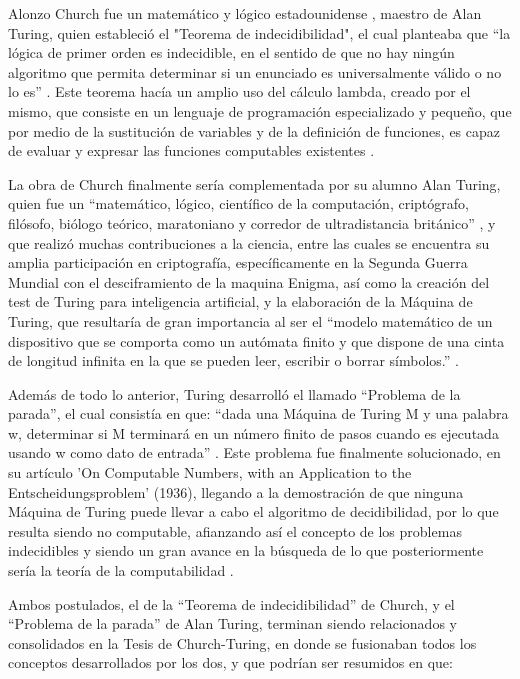 \documentclass[11pt]{article}
\begin{document}
{Alonzo Church fue un matemático y lógico estadounidense \citep{ChurchWiki}, maestro de Alan Turing, quien estableció el "Teorema de indecidibilidad", el cual planteaba que “la lógica de primer orden es indecidible, en el sentido de que no hay ningún algoritmo que permita determinar si un enunciado es universalmente válido o no lo es” \citep{RojasBarba}. Este teorema hacía un amplio uso del cálculo lambda, creado por el mismo, que consiste en un lenguaje de programación especializado y pequeño, que por medio de la sustitución de variables y de la definición de funciones, es capaz de evaluar y expresar las funciones computables existentes \citep{LambdaEcu}.
\newline

La obra de Church finalmente sería complementada por su alumno Alan Turing, quien fue un “matemático, lógico, científico de la computación, criptógrafo, filósofo, biólogo teórico, maratoniano y corredor de ultradistancia británico” \citep{TuringWiki}, y que realizó muchas contribuciones a la ciencia, entre las cuales se encuentra su amplia participación en criptografía, específicamente en la Segunda Guerra Mundial con el desciframiento de la maquina Enigma, así como la creación del test de Turing para inteligencia artificial, y la elaboración de la Máquina de Turing, que resultaría de gran importancia al ser el “modelo matemático de un dispositivo que se comporta como un autómata finito y que dispone de una cinta de longitud infinita en la que se pueden leer, escribir o borrar símbolos.” \citep{Llopismatesfacil}.
\newline

Además de todo lo anterior, Turing desarrolló el llamado “Problema de la parada”, el cual consistía en que: “dada una Máquina de Turing M y una palabra w, determinar si M terminará en un número finito de pasos cuando es ejecutada usando w como dato de entrada” \citep{ParadaWiki}. Este problema fue finalmente solucionado, en su artículo 'On Computable Numbers, with an Application to the Entscheidungsproblem' (1936), llegando a la demostración de que ninguna Máquina de Turing puede llevar a cabo el algoritmo de decidibilidad, por lo que resulta siendo no computable, afianzando así el concepto de los problemas indecidibles y siendo un gran avance en la búsqueda de lo que posteriormente sería la teoría de la computabilidad \citep{Llopismatesfacil}.
\newline

Ambos postulados, el de la “Teorema de indecidibilidad” de Church, y el “Problema de la parada” de Alan Turing, terminan siendo relacionados y consolidados en la Tesis de Church-Turing, en donde se fusionaban todos los conceptos desarrollados por los dos, y que podrían ser resumidos en que: 

}
\end{document}
